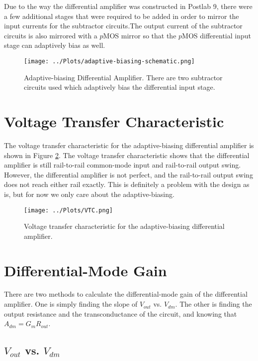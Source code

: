 \documentclass{article}
\begin{document}
    Due to the way the differential amplifier was constructed in Postlab 9, there were a few additional stages that were required to be added in order to mirror the input currents for the subtractor circuits.The output current of the subtractor circuits is also mirrored with a $p$MOS mirror so that the $p$MOS differential input stage can adaptively bias as well.

    \begin{figure}[h]
        \centering
        \texttt{[image: ../Plots/adaptive-biasing-schematic.png]}
        \caption{Adaptive-biasing Differential Amplifier. There are two subtractor circuits used which adaptively bias the differential input stage.}
        \label{fig:schematic-adaptive}
    \end{figure}


\newpage
\section{Voltage Transfer Characteristic}

    The voltage transfer characteristic for the adaptive-biasing differential amplifier is shown in Figure \ref{fig:VTC}. The voltage transfer characteristic shows that the differential amplifier is still rail-to-rail common-mode input and rail-to-rail output swing. However, the differential amplifier is not perfect, and the rail-to-rail output swing does not reach either rail exactly. This is definitely a problem with the design as is, but for now we only care about the adaptive-biasing.

    \begin{figure}[h]
        \centering
        \texttt{[image: ../Plots/VTC.png]}
        \caption{Voltage transfer characteristic for the adaptive-biasing differential amplifier.}
        \label{fig:VTC}
    \end{figure}


\newpage
\section{Differential-Mode Gain}

    There are two methods to calculate the differential-mode gain of the differential amplifier. One is simply finding the slope of $V_{out}$ vs. $V_{dm}$. The other is finding the output resistance and the transconductance of the circuit, and knowing that $A_{dm} = G_{m}R_{out}$. 

    \subsection{$V_{out}$ vs. $V_{dm}$}
\end{document}
